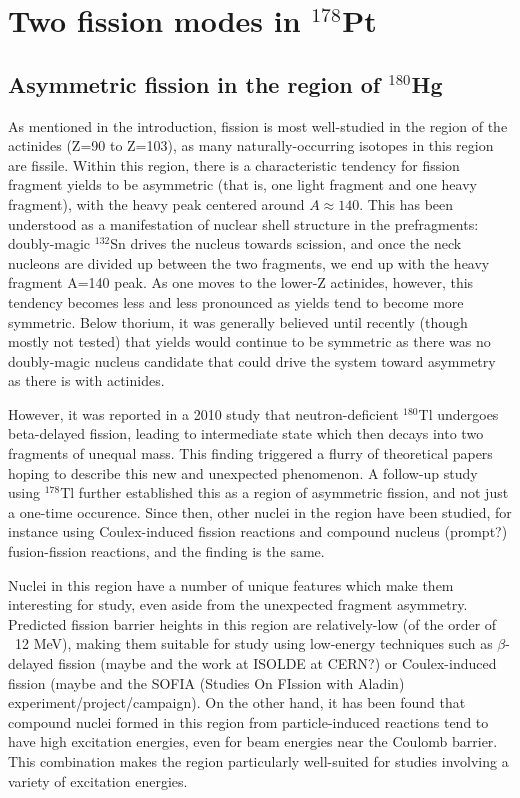 \chapter{Two fission modes in $^{178}$Pt}\label{chap:178Pt}

\section{Asymmetric fission in the region of $^{180}$Hg}
As mentioned in the introduction, fission is most well-studied in the region of the actinides (Z=90 to Z=103), as many naturally-occurring isotopes in this region are fissile. Within this region, there is a characteristic tendency for fission fragment yields to be asymmetric (that is, one light fragment and one heavy fragment), with the heavy peak centered around $A\approx140$. This has been understood as a manifestation of nuclear shell structure in the prefragments: doubly-magic $^{132}$Sn drives the nucleus towards scission, and once the neck nucleons are divided up between the two fragments, we end up with the heavy fragment A=140 peak. As one moves to the lower-Z actinides, however, this tendency becomes less and less pronounced as yields tend to become more symmetric. Below thorium, it was generally believed until recently (though mostly not tested) that yields would continue to be symmetric as there was no doubly-magic nucleus candidate that could drive the system toward asymmetry as there is with actinides.

However, it was reported in a 2010 study \cite{Andreyev2010} that neutron-deficient $^{180}$Tl undergoes beta-delayed fission, leading to intermediate state {\Hg} which then decays into two fragments of unequal mass. This finding triggered a flurry of theoretical papers hoping to describe this new and unexpected phenomenon. A follow-up study using $^{178}$Tl \cite{Liberati2013} further established this as a region of asymmetric fission, and not just a one-time occurence. Since then, other nuclei in the region have been studied, for instance using Coulex-induced fission reactions and compound nucleus (prompt?) fusion-fission reactions, and the finding is the same. 

Nuclei in this region have a number of unique features which make them interesting for study, even aside from the unexpected fragment asymmetry. Predicted fission barrier heights in this region are relatively-low (of the order of ~12 MeV), making them suitable for study using low-energy techniques such as $\beta$-delayed fission (maybe \cite{Andreyev2013} and the work at ISOLDE at CERN?) or Coulex-induced fission (maybe \cite{Martin2015} and the SOFIA (Studies On FIssion with Aladin) experiment/project/campaign). On the other hand, it has been found that compound nuclei formed in this region from particle-induced reactions tend to have high excitation energies, even for beam energies near the Coulomb barrier. This combination makes the region particularly well-suited for studies involving a variety of excitation energies.

